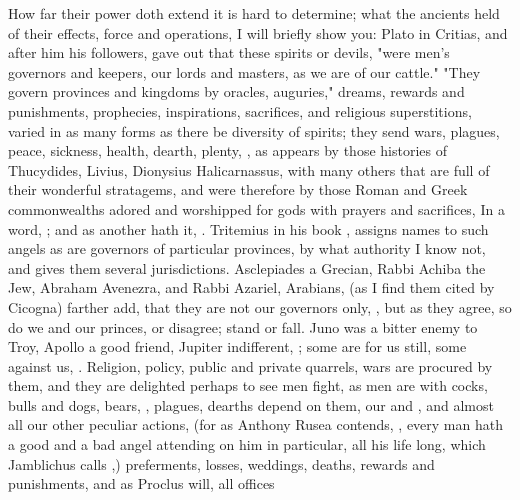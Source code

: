 How far their power doth extend it is hard to determine; what the ancients held
of their effects, force and operations, I will briefly show you: Plato in
Critias, and after him his followers, gave out that these spirits or devils,
"were men's governors and keepers, our lords and masters, as we are of our
cattle." "They govern provinces and kingdoms by oracles,
auguries," dreams, rewards and punishments, prophecies, inspirations,
sacrifices, and religious superstitions, varied in as many forms as there be
diversity of spirits; they send wars, plagues, peace, sickness, health, dearth,
plenty, , \etc{} as appears by those histories of Thucydides, Livius,
Dionysius Halicarnassus, with many others that are full of their wonderful
stratagems, and were therefore by those Roman and Greek commonwealths adored
and worshipped for gods with prayers and sacrifices, \etc{}
In a word, ; and as another hath it, . Tritemius in his book
, assigns names to such angels as are
governors of particular provinces, by what authority I know not, and gives them
several jurisdictions. Asclepiades a Grecian, Rabbi Achiba the Jew, Abraham
Avenezra, and Rabbi Azariel, Arabians, (as I find them cited by
Cicogna) farther add, that they are not our governors
only, , but as they agree, so do we and our princes, or disagree; stand or
fall. Juno was a bitter enemy to Troy, Apollo a good friend, Jupiter
indifferent, ; some are for us
still, some against us, . Religion,
policy, public and private quarrels, wars are procured by them, and they are
delighted perhaps to see men fight, as men are with cocks,
bulls and dogs, bears, \etc{}, plagues, dearths depend on them, our 
and , and almost all our other peculiar actions, (for as Anthony
Rusea contends, , every man hath a good
and a bad angel attending on him in particular, all his life long, which
Jamblichus calls ,) preferments, losses, weddings, deaths, rewards
and punishments, and as Proclus will, all offices
